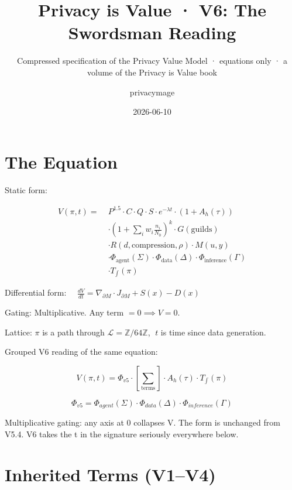 \documentclass[
  11pt,
]{article}
\title{Privacy is Value · V6: The Swordsman Reading}
\subtitle{Compressed specification of the Privacy Value Model ·
equations only · a volume of the Privacy is Value book}
\author{privacymage}
\date{2026-06-10}
\begin{document}
\maketitle

\section{The Equation}\label{the-equation}

Static form:

\[\boxed{\begin{aligned}
V(\pi, t) = \; & P^{1.5} \cdot C \cdot Q \cdot S \cdot e^{-\lambda t} \cdot (1 + A_h(\tau)) \\
& \cdot \left(1 + \sum_i w_i \frac{n_i}{N_0}\right)^k \cdot G(\text{guilds}) \\
& \cdot R(d, \text{compression}, \rho) \cdot M(u, y) \\
& \cdot \Phi_{\text{agent}}(\Sigma) \cdot \Phi_{\text{data}}(\Delta) \cdot \Phi_{\text{inference}}(\Gamma) \\
& \cdot T_{\!\int}(\pi)
\end{aligned}}\]

Differential form:
\(\quad \frac{dV}{dt} = \nabla_{\partial M} \cdot J_{\partial M} + S(x) - D(x)\)

Gating: Multiplicative. Any term \(= 0 \implies V = 0\).

Lattice: \(\pi\) is a path through
\(\mathcal{L} = \mathbb{Z}/64\mathbb{Z}\), \(\;t\) is time since data
generation.

Grouped V6 reading of the same equation:

\[V(\pi, t) = \Phi_{v5} \cdot \left[ \sum_{\text{terms}} \right] \cdot A_h(\tau) \cdot T_{\int}(\pi)\]

\[\Phi_{v5} = \Phi_{agent}(\Sigma) \cdot \Phi_{data}(\Delta) \cdot \Phi_{inference}(\Gamma)\]

Multiplicative gating: any axis at 0 collapses V. The form is unchanged
from V5.4. V6 takes the t in the signature seriously everywhere below.

\section{Inherited Terms (V1--V4)}\label{inherited-terms-v1v4}
\end{document}

